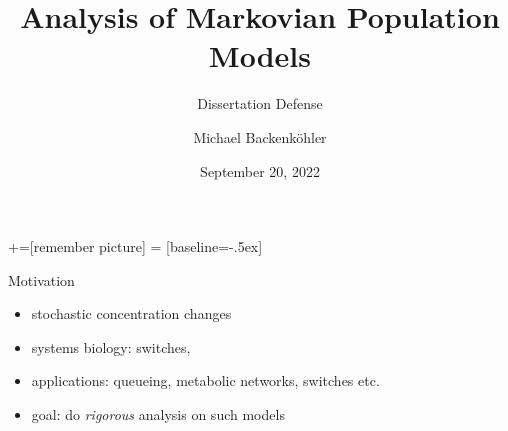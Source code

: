 \documentclass[10pt]{beamer}
\title{Analysis of Markovian Population Models}
\subtitle{Dissertation Defense}
\author{Michael Backenk\"{o}hler}
\institute{Saarland Informatics Campus}
\date{September 20, 2022}
\begin{document}
+=[remember picture]
 = [baseline=-.5ex]

\begin{frame}
\titlepage
\end{frame}

\begin{frame}{Motivation}
  \begin{itemize}
    \item stochastic concentration changes
    \item systems biology: switches, 
    \item applications: queueing, metabolic networks, switches etc.
    \item goal: do \emph{rigorous} analysis on such models
  \end{itemize}
\end{frame}
\end{document}
